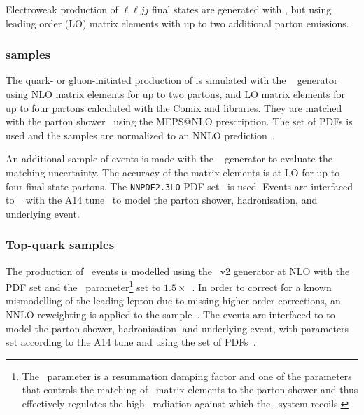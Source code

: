 Electroweak production of $\ell\ell jj$ final states are generated with , but using leading
order (LO) matrix elements with up to two additional parton emissions.

\subsubsection{\Zjets samples}

The quark- or gluon-initiated production of \Zjets is simulated with the ~\cite{Bothmann:2019yzt} generator using NLO matrix elements for up to two partons, and LO matrix elements for up to four partons calculated with the Comix and \openloops libraries.
They are matched with the \SHERPA parton shower~\cite{Schumann:2007mg} using the MEPS@NLO prescription.
The \nnpdfnnlo set of PDFs is used and the samples are normalized to an NNLO prediction~\cite{Anastasiou:2003ds}.

An additional sample of \Zjets events is made with the
\MGFiveNLO~\cite{Alwall:2014hca} generator to evaluate the matching
uncertainty. The accuracy of the matrix elements is at LO for up to four
final-state partons. The \texttt{NNPDF2.3LO} PDF set~\cite{Ball:2012cx} is
used. Events are interfaced to ~\cite{Sjostrand:2007gs} with the
A14 tune~\cite{ATL-PHYS-PUB-2014-021} to model the parton shower,
hadronisation, and underlying event.

\subsubsection{Top-quark samples}

The production of \ttbar\ events is modelled using the \powhegbox~v2 generator at NLO with the \nnpdfnlo PDF set and the \hdamp\ parameter\footnote{The \hdamp\ parameter is a resummation damping factor and one of the parameters that controls the matching of \Powheg\ matrix elements to the parton shower and thus effectively regulates the high-\pt\ radiation against which the \ttbar\ system recoils.} set to $1.5\times$\mtop~\cite{ATL-PHYS-PUB-2016-020}.
In order to correct for a known mismodelling of the leading lepton \pt due to missing higher-order corrections, an NNLO reweighting is applied to the sample~\cite{NNLOReweighting}.
The events are interfaced to  to model the parton shower, hadronisation, and underlying event, with parameters set according to the A14 tune and using the \nnpdftwo set of PDFs~\cite{Ball:2012cx}.

